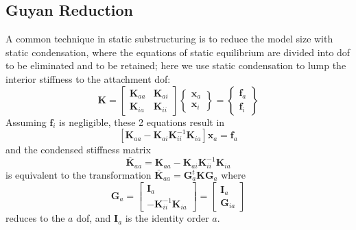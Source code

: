 \documentclass[10pt,openany,twoside]{book}
\numberwithin{equation}{section}   %
\newcommand{\Matrix}[1]{\boldsymbol{#1}}
\newcommand{\Vector}[1]{\boldsymbol{#1}}
\begin{document}
\subsection{\label{sect:guyan-red}Guyan Reduction}
A common technique in static substructuring is to reduce the
model size with static condensation, where the equations of
static equilibrium are divided into dof to be eliminated and to be
retained; here we use static condensation to lump the interior stiffness 
to the attachment dof:
\begin{equation}
\Matrix{K} = \left[
\begin{array}{cc}
   \Matrix{K}_{aa} & \Matrix{K}_{ai} \\
   \Matrix{K}_{ia} & \Matrix{K}_{ii}
\end{array}
\right]
\left\{
\begin{array}{c}
   \Vector{x}_a \\
   \Vector{x}_i
\end{array}
\right\} =
\left\{
\begin{array}{c}
   \Vector{f}_a \\
   \Vector{f}_i
\end{array}
\right\}		\nonumber
\end{equation}
Assuming $\Vector{f}_i$ is negligible, these 2 equations result in
\begin{equation}\label{eqn:static-cond}
\left[\Matrix{K}_{aa}
	- \Matrix{K}_{ai}\Matrix{K}_{ii}^{-1}\Matrix{K}_{ia}\right]
		\Vector{x}_a = \Vector{f}_a
\end{equation}
and the condensed stiffness matrix
\begin{equation}\label{eqn:condensedK}
\Matrix{\bar{K}}_{aa} = 
	\Matrix{K}_{aa} - \Matrix{K}_{ai}\Matrix{K}_{ii}^{-1}\Matrix{K}_{ia}
\end{equation}
is equivalent to the transformation
$\Matrix{\bar{K}}_{aa} = \Matrix{G}_a^t\Matrix{K}\Matrix{G}_a$
where
\begin{equation} \label{eqn:static-ss}
\Matrix{G}_a = \left[
	\begin{array}{c}
		\Matrix{I}_a \\
		-\Matrix{K}_{ii}^{-1}\Matrix{K}_{ia}
	\end{array} \right] =
	\left[\begin{array}{c}
		\Matrix{I}_a \\
		\Matrix{G}_{ia}
	\end{array} \right]
\end{equation}
reduces to the $a$ dof, and $\Matrix{I}_a$ is the identity order $a$.
\end{document}
